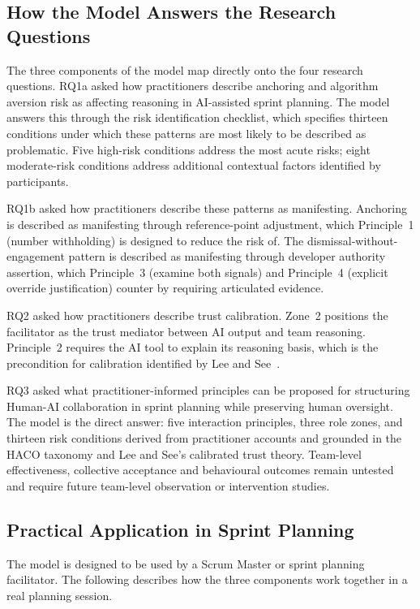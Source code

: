 \documentclass[a4paper,twoside]{bth}
\begin{document}
\subsection{How the Model Answers the Research Questions}

The three components of the model map directly onto the four research questions. RQ1a asked how practitioners describe anchoring and algorithm aversion risk as affecting reasoning in AI-assisted sprint planning. The model answers this through the risk identification checklist, which specifies thirteen conditions under which these patterns are most likely to be described as problematic. Five high-risk conditions address the most acute risks; eight moderate-risk conditions address additional contextual factors identified by participants.

RQ1b asked how practitioners describe these patterns as manifesting. Anchoring is described as manifesting through reference-point adjustment, which Principle~1 (number withholding) is designed to reduce the risk of. The dismissal-without-engagement pattern is described as manifesting through developer authority assertion, which Principle~3 (examine both signals) and Principle~4 (explicit override justification) counter by requiring articulated evidence.

RQ2 asked how practitioners describe trust calibration. Zone~2 positions the facilitator as the trust mediator between AI output and team reasoning. Principle~2 requires the AI tool to explain its reasoning basis, which is the precondition for calibration identified by Lee and See~\cite{lee2004trust}.

RQ3 asked what practitioner-informed principles can be proposed for structuring Human-AI collaboration in sprint planning while preserving human oversight. The model is the direct answer: five interaction principles, three role zones, and thirteen risk conditions derived from practitioner accounts and grounded in the HACO taxonomy and Lee and See's calibrated trust theory. Team-level effectiveness, collective acceptance and behavioural outcomes remain untested and require future team-level observation or intervention studies.

\subsection{Practical Application in Sprint Planning}

The model is designed to be used by a Scrum Master or sprint planning facilitator. The following describes how the three components work together in a real planning session.
\end{document}
